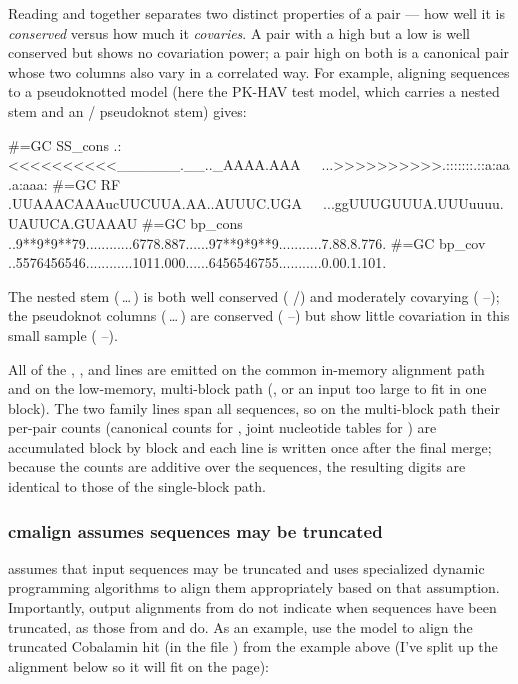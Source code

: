 Reading  and  together separates two distinct
properties of a pair --- how well it is \emph{conserved} versus how much it
\emph{covaries}. A pair with a high  but a low 
is well conserved but shows no covariation power; a pair high on both is a
canonical pair whose two columns also vary in a correlated way. For example,
aligning sequences to a pseudoknotted model (here the PK-HAV test model, which
carries a nested stem and an / pseudoknot stem) gives:

\begin{sreoutput}
#=GC SS_cons   .:<<<<<<<<<<______.__.._AAAA.AAA~~~...>>>>>>>>>>.:::::::.::a:aa.a:aaa:
#=GC RF        .UUAAACAAAucUUCUUA.AA..AUUUC.UGA~~~...ggUUUGUUUA.UUUuuuu.UAUUCA.GUAAAU
#=GC bp_cons   ..9**9*9**79............6778.887......97**9*9**9...........7.88.8.776.
#=GC bp_cov    ..5576456546............1011.000......6456546755...........0.00.1.101.
\end{sreoutput}

The nested stem (\otext{<<<<}\,\ldots\,\otext{>>>>}) is both well conserved
( /\otext{*}) and moderately covarying (
--); the pseudoknot columns (\,\ldots\,)
are conserved ( --) but show little covariation
in this small sample ( --).

All of the , , and 
lines are emitted on the common in-memory alignment path and on the low-memory,
multi-block path (, or an input too large to fit in one block).
The two  family lines span all sequences, so on the multi-block path
their per-pair counts (canonical counts for , joint nucleotide
tables for ) are accumulated block by block and each line is
written once after the final merge; because the counts are additive over the
sequences, the resulting digits are identical to those of the single-block path.

\subsubsection{cmalign assumes sequences may be truncated}
 assumes that input sequences may be truncated and uses
specialized dynamic programming algorithms to align them appropriately
based on that assumption. Importantly, output
alignments from  do not indicate when sequences have
been truncated, as those from  and  do. As
an example, use the  model to align the
truncated Cobalamin hit (in the file )
from the  example above (I've split up the alignment
below so it will fit on the page):

